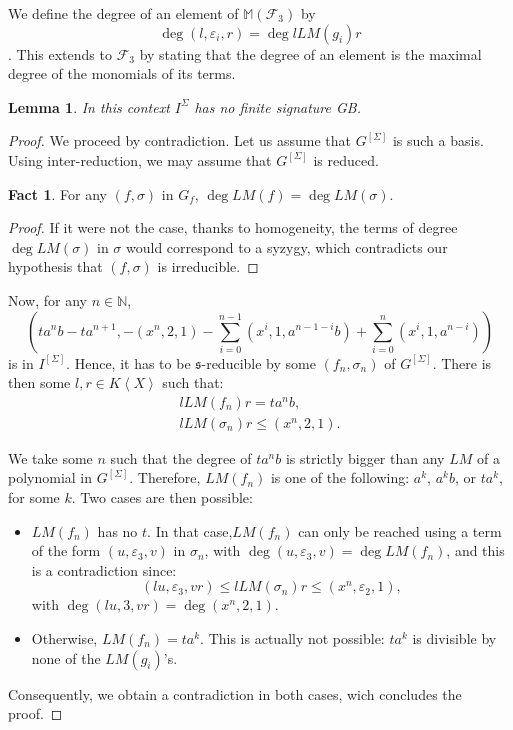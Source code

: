 \documentclass[sigconf]{acmart}
\theoremstyle{plain}
\newtheorem{lem}{Lemma}[section]
\theoremstyle{definition}
\newtheorem*{fact}{Fact}
\theoremstyle{remark}
\newcommand{\N}{\mathbb{N}}
\newcommand{\MM}{\mathbb M}
\newcommand{\sss}{\mathfrak{s}}
\newcommand{\LM}{LM}
\newcommand{\GS}{G^{[\Sigma]}}
\newcommand{\KX}{K \left\langle X \right\rangle}
\begin{document}
We define the 
degree of an element of 
$\MM \left( \mathscr{F}_3 \right)$
by $$\deg{(l, \varepsilon_i, r)} = \deg{l \LM(g_i) r}$$.
This extends to $\mathscr{F}_3$
by stating that the 
degree of 
an element is the maximal
degree of the monomials
of its terms.

\begin{lem}
	In this context
	$I^\Sigma$ has no
	finite signature GB.
\end{lem}
\begin{proof}
We proceed by contradiction.
Let us assume that $G^{[\Sigma]}$ is such 
a basis.
Using inter-reduction,
we may assume that
$G^{[\Sigma]}$
is reduced.	
	
	\begin{fact}
		For any $(f,\sigma)$ in $G_f$, $\deg{\LM(f)} = \deg{\LM(\sigma)}$.
	\end{fact}
	\begin{proof}
	If it were not the case,
	 thanks to
	homogeneity,
	the terms of 
	degree  $\deg{\LM(\sigma)}$ in $\sigma$ would correspond to
	a syzygy, which contradicts our hypothesis
	that $(f,\sigma)$ is
	irreducible.
	\end{proof}
	
Now, for any $n \in \N$,
	$$\left(ta^nb - ta^{n+1}, - (x^n, 2, 1)
		- \sum_{i = 0}^{n - 1}(x^i, 1, a^{n - 1 - i}b) + 
		\sum_{i = 0}^{n} (x^i, 1, a^{n - i})
		  \right)$$
	is in $I^{[\Sigma]}.$
Hence, it has to be
$\sss$-reducible
by some 
 $(f_n, \sigma_n)$ of $G^{[\Sigma]}$.
 There is then some
 $l, r \in \KX$ such that:
	\begin{align*}
		l\LM(f_n)r = ta^nb, \\
		l \LM(\sigma_n) r \leq (x^n, 2, 1).
	\end{align*}
	
We take some $n$
such that 
the degree of $ta^nb$
is strictly bigger
than any $\LM$
of a polynomial
in $\GS$. 
	Therefore, $\LM(f_n)$ is one of the following: $a^k$, $a^kb$, or $ta^k$,
	for some $k.$
Two cases are then possible:	
	\begin{itemize}
		\item $\LM(f_n)$ 
		has no $t$. 
		In that case,$\LM(f_n)$  can only
be reached using 
a term of the form
$(u, \varepsilon_3, v)$ 
in $\sigma_n$, with $\deg (u, \varepsilon_3, v) = \deg \LM(f_n)$,
and this is a contradiction
since:
		$$(lu, \varepsilon_3, vr) \leq l \LM(\sigma_n) r \leq (x^n, \varepsilon_2, 1),$$
		with $\deg (lu, 3, vr) = \deg (x^n, 2, 1)$.
		
		\item Otherwise, $\LM(f_n) = ta^k$.
		This is actually
not possible:
$ta^k$ is divisible
by none of the $\LM(g_i)$'s.
	\end{itemize}
Consequently, we obtain
a contradiction in both
cases, wich concludes
the proof.
\end{proof}
\end{document}
